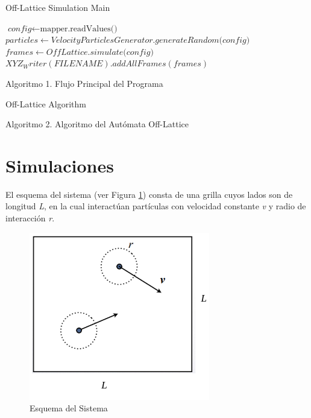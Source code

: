 \documentclass[12pt, a4paper]{report}
\makeatletter
\def\BState{\State\hskip-\ALG@thistlm}
\makeatother
\begin{document}
\pagebreak
\begin{algorithm}
    \caption{Off-Lattice Simulation Main}\label{main}
    \begin{algorithmic}[1]
    \State $\textit{config} \gets \text{mapper.readValues()}$
    \State $particles \gets \textit{VelocityParticlesGenerator.generateRandom(config)}$
    \State $frames \gets \textit{OffLattice.simulate(config)}$
    \State $XYZ_Writer(FILENAME).addAllFrames(frames)$
    \EndProcedure
    \end{algorithmic}
\end{algorithm}
\begin{center}
Algoritmo 1. Flujo Principal del Programa
\end{center}

\begin{algorithm}
    \caption{Off-Lattice Algorithm}\label{offLattice}
\end{algorithm}
\begin{center}
Algoritmo 2. Algoritmo del Autómata Off-Lattice
\end{center}

\section{Simulaciones}

El esquema del sistema (ver Figura \ref{fig:esquema}) consta de una grilla cuyos lados son de longitud \emph{L}, en la cual interactúan partículas con velocidad constante \emph{v} y radio de interacción \emph{r}.

\begin{figure}[h]
\includegraphics[scale=0.42]{esquema.png}
\centering 
\caption{Esquema del Sistema}
\label{fig:esquema}
\end{figure}
\end{document}
